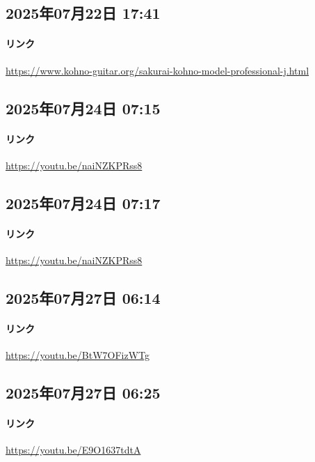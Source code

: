 \subsection*{2025年07月22日 17:41}

\paragraph{リンク}
\url{https://www.kohno-guitar.org/sakurai-kohno-model-professional-j.html}

\subsection*{2025年07月24日 07:15}

\paragraph{リンク}
\url{https://youtu.be/naiNZKPRss8}

\subsection*{2025年07月24日 07:17}

\paragraph{リンク}
\url{https://youtu.be/naiNZKPRss8}

\subsection*{2025年07月27日 06:14}

\paragraph{リンク}
\url{https://youtu.be/BtW7OFizWTg}

\subsection*{2025年07月27日 06:25}

\paragraph{リンク}
\url{https://youtu.be/E9O1637tdtA}

